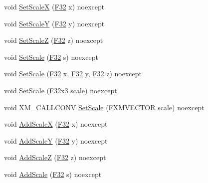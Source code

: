 \begin{DoxyCompactItemize}
\item 
void \mbox{\hyperlink{classmage_1_1_s_e_t_transform3_d_a7ea35e6ee763b81b9669ba71baf1cc29}{Set\+ScaleX}} (\mbox{\hyperlink{namespacemage_aa97e833b45f06d60a0a9c4fc22ae02c0}{F32}} x) noexcept
\item 
void \mbox{\hyperlink{classmage_1_1_s_e_t_transform3_d_a7f36c0d3dbb1eec4634fbbcbeca10ae7}{Set\+ScaleY}} (\mbox{\hyperlink{namespacemage_aa97e833b45f06d60a0a9c4fc22ae02c0}{F32}} y) noexcept
\item 
void \mbox{\hyperlink{classmage_1_1_s_e_t_transform3_d_a012dc80a6e26ac41954e49b82ee05904}{Set\+ScaleZ}} (\mbox{\hyperlink{namespacemage_aa97e833b45f06d60a0a9c4fc22ae02c0}{F32}} z) noexcept
\item 
void \mbox{\hyperlink{classmage_1_1_s_e_t_transform3_d_a4954b77cfef4a437a09ce9902a284dcf}{Set\+Scale}} (\mbox{\hyperlink{namespacemage_aa97e833b45f06d60a0a9c4fc22ae02c0}{F32}} s) noexcept
\item 
void \mbox{\hyperlink{classmage_1_1_s_e_t_transform3_d_afaa1fdc10ad9115d978a7df58f53e3aa}{Set\+Scale}} (\mbox{\hyperlink{namespacemage_aa97e833b45f06d60a0a9c4fc22ae02c0}{F32}} x, \mbox{\hyperlink{namespacemage_aa97e833b45f06d60a0a9c4fc22ae02c0}{F32}} y, \mbox{\hyperlink{namespacemage_aa97e833b45f06d60a0a9c4fc22ae02c0}{F32}} z) noexcept
\item 
void \mbox{\hyperlink{classmage_1_1_s_e_t_transform3_d_aa66ccfd73dd92683184e44b8b0e47066}{Set\+Scale}} (\mbox{\hyperlink{namespacemage_a1e3c7a882af461f161caa1cbddaf1fa2}{F32x3}} scale) noexcept
\item 
void X\+M\+\_\+\+C\+A\+L\+L\+C\+O\+NV \mbox{\hyperlink{classmage_1_1_s_e_t_transform3_d_af3d30633cdfcb5b4f8b8d4975b0009e9}{Set\+Scale}} (F\+X\+M\+V\+E\+C\+T\+OR scale) noexcept
\item 
void \mbox{\hyperlink{classmage_1_1_s_e_t_transform3_d_a09993145399d3a3a88a01dedde349a51}{Add\+ScaleX}} (\mbox{\hyperlink{namespacemage_aa97e833b45f06d60a0a9c4fc22ae02c0}{F32}} x) noexcept
\item 
void \mbox{\hyperlink{classmage_1_1_s_e_t_transform3_d_ab1efcb1b94d1758e3464921a8c68ff68}{Add\+ScaleY}} (\mbox{\hyperlink{namespacemage_aa97e833b45f06d60a0a9c4fc22ae02c0}{F32}} y) noexcept
\item 
void \mbox{\hyperlink{classmage_1_1_s_e_t_transform3_d_ad841cfeaf041523e7d9dc4bb7cf1384d}{Add\+ScaleZ}} (\mbox{\hyperlink{namespacemage_aa97e833b45f06d60a0a9c4fc22ae02c0}{F32}} z) noexcept
\item 
void \mbox{\hyperlink{classmage_1_1_s_e_t_transform3_d_abd5cd3c36133c76c4aee22ae812d50ed}{Add\+Scale}} (\mbox{\hyperlink{namespacemage_aa97e833b45f06d60a0a9c4fc22ae02c0}{F32}} s) noexcept

\end{DoxyCompactItemize}
